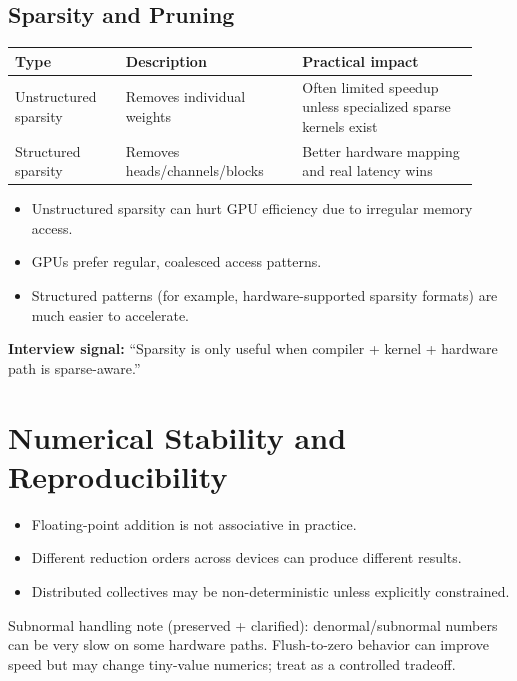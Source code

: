 \documentclass[11pt]{article}
\begin{document}
\subsection{Sparsity and Pruning}
\begin{center}
\begin{tabular}{|p{0.22\linewidth}|p{0.35\linewidth}|p{0.35\linewidth}|}
\hline
\textbf{Type} & \textbf{Description} & \textbf{Practical impact} \\
\hline
Unstructured sparsity & Removes individual weights & Often limited speedup unless specialized sparse kernels exist \\
\hline
Structured sparsity & Removes heads/channels/blocks & Better hardware mapping and real latency wins \\
\hline
\end{tabular}
\end{center}
\begin{itemize}[leftmargin=1.2em]
\item Unstructured sparsity can hurt GPU efficiency due to irregular memory access.
\item GPUs prefer regular, coalesced access patterns.
\item Structured patterns (for example, hardware-supported sparsity formats) are much easier to accelerate.
\end{itemize}
\begin{tcolorbox}[colback=insight]
    \textbf{Interview signal:} ``Sparsity is only useful when compiler + kernel + hardware path is sparse-aware.''
    \end{tcolorbox}
    
\section{Numerical Stability and Reproducibility}

\begin{itemize}[leftmargin=1.2em]
\item Floating-point addition is not associative in practice.
\item Different reduction orders across devices can produce different results.
\item Distributed collectives may be non-deterministic unless explicitly constrained.
\end{itemize}

Subnormal handling note (preserved + clarified): denormal/subnormal numbers can be very slow on some hardware paths. Flush-to-zero behavior can improve speed but may change tiny-value numerics; treat as a controlled tradeoff.
\end{document}
